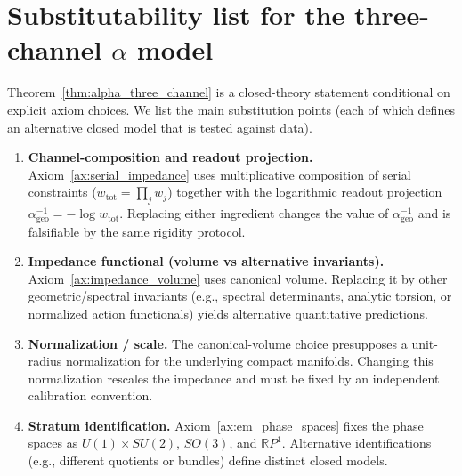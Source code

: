 \section{Substitutability list for the three-channel \texorpdfstring{$\alpha$}{alpha} model}
\label{app:alpha_substitutability}

Theorem~\ref{thm:alpha_three_channel} is a closed-theory statement conditional on explicit axiom choices. We list the main substitution points (each of which defines an alternative closed model that is tested against data).

\begin{enumerate}
    \item \textbf{Channel-composition and readout projection.} Axiom~\ref{ax:serial_impedance} uses multiplicative composition of serial constraints ($w_{\mathrm{tot}}=\prod_j w_j$) together with the logarithmic readout projection $\alpha_{\mathrm{geo}}^{-1}=-\log w_{\mathrm{tot}}$. Replacing either ingredient changes the value of $\alpha_{\mathrm{geo}}^{-1}$ and is falsifiable by the same rigidity protocol.
    \item \textbf{Impedance functional (volume vs alternative invariants).} Axiom~\ref{ax:impedance_volume} uses canonical volume. Replacing it by other geometric/spectral invariants (e.g., spectral determinants, analytic torsion, or normalized action functionals) yields alternative quantitative predictions.
    \item \textbf{Normalization / scale.} The canonical-volume choice presupposes a unit-radius normalization for the underlying compact manifolds. Changing this normalization rescales the impedance and must be fixed by an independent calibration convention.
    \item \textbf{Stratum identification.} Axiom~\ref{ax:em_phase_spaces} fixes the phase spaces as $U(1)\times SU(2)$, $SO(3)$, and $\mathbb{R}P^1$. Alternative identifications (e.g., different quotients or bundles) define distinct closed models.
\end{enumerate}

